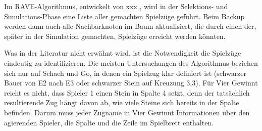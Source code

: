 Im RAVE-Algorithmus, entwickelt von xxx , wird in der Selektions- und Simulations-Phase eine Liste aller gemachten Spielzüge geführt. Beim Backup werden dann auch alle Nachbarknoten im Baum aktualisiert, die durch einen der, später in der Simulation gemachten, Spielzüge erreicht werden könnten.

Was in der Literatur nicht erwähnt wird, ist die Notwendigkeit die Spielzüge eindeutig zu identifizieren. Die meisten Untersuchungen des Algorithmus beziehen sich nur auf Schach und Go, in denen ein Spielzug klar definiert ist (schwarzer Bauer von E2 nach E3 oder schwarzer Stein auf Kreuzung 3,3). Für Vier Gewinnt reicht es nicht, dass Spieler 1 einen Stein in Spalte 4 setzt, denn der tatsächlich resultierende Zug hängt davon ab, wie viele Steine sich bereits in der Spalte befinden. Darum muss jeder Zugname in Vier Gewinnt Informationen über den agierenden Spieler, die Spalte und die Zeile im Spielbrett enthalten.
